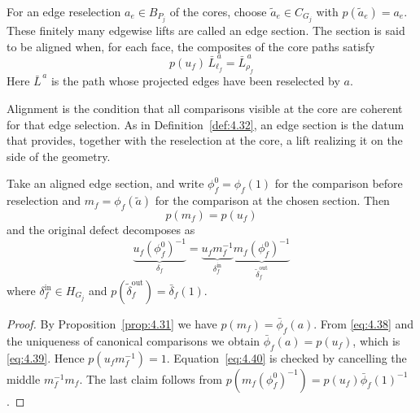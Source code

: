 \begin{definition}\label{def:4.32}

For an edge reselection $a_e\in B_{P_j}$ of the cores, choose
$\widetilde a_e\in C_{G_j}$ with $p(\widetilde a_e)=a_e$.
These finitely many edgewise lifts are called an edge section.
The section is said to be aligned when, for each face, the composites of the core paths
satisfy
\begin{equation*}
p(u_f)\,\bar L_{\ell_f}^{\,a}
=\bar L_{\rho_f}^{\,a}
\tag{4.38}\label{eq:4.38}
\end{equation*}
Here $\bar L^{\,a}$ is the path whose projected edges have been reselected by $a$.

Alignment is the condition that all comparisons visible at the core are coherent for that
edge selection.
As in Definition~\ref{def:4.32}, an edge section is the datum that provides, together
with the reselection at the core, a lift realizing it on the side of the geometry.

\end{definition}

\begin{theorem}\label{thm:4.33}

Take an aligned edge section, and write $\phi_f^0=\phi_f(1)$ for the comparison before
reselection and $m_f=\phi_f(\widetilde a)$ for the comparison at the chosen section. Then
\begin{equation*}
p(m_f)=p(u_f)
\tag{4.39}\label{eq:4.39}
\end{equation*}
and the original defect decomposes as
\begin{equation*}
\underbrace{u_f(\phi_f^0)^{-1}}_{\delta_f}
=
\underbrace{u_fm_f^{-1}}_{\delta_f^{\mathrm{in}}}
\underbrace{m_f(\phi_f^0)^{-1}}_{\widetilde\delta_f^{\mathrm{out}}}
\tag{4.40}\label{eq:4.40}
\end{equation*}
where
$\delta_f^{\mathrm{in}}\in H_{G_j}$ and
$p(\widetilde\delta_f^{\mathrm{out}})=\bar\delta_f(1)$.

\end{theorem}

\begin{proof}

By Proposition~\ref{prop:4.31} we have $p(m_f)=\bar\phi_f(a)$.
From \eqref{eq:4.38} and the uniqueness of canonical comparisons we obtain
$\bar\phi_f(a)=p(u_f)$, which is \eqref{eq:4.39}.
Hence $p(u_fm_f^{-1})=1$.
Equation~\eqref{eq:4.40} is checked by cancelling the middle $m_f^{-1}m_f$.
The last claim follows from
$p(m_f(\phi_f^0)^{-1})=p(u_f)\bar\phi_f(1)^{-1}$.

\end{proof}

